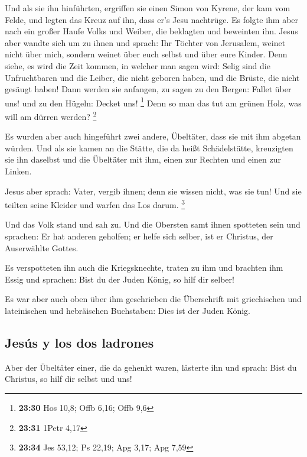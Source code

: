  Und als sie ihn hinführten, ergriffen sie einen Simon
von Kyrene, der kam vom Felde, und legten das Kreuz auf ihn, dass er's
Jesu nachtrüge.  Es folgte ihm aber nach ein großer Haufe
Volks und Weiber, die beklagten und beweinten ihn.  Jesus
aber wandte sich um zu ihnen und sprach: Ihr Töchter von Jerusalem,
weinet nicht über mich, sondern weinet über euch selbst und über eure
Kinder.  Denn siehe, es wird die Zeit kommen, in welcher
man sagen wird: Selig sind die Unfruchtbaren und die Leiber, die nicht
geboren haben, und die Brüste, die nicht gesäugt haben! 
Dann werden sie anfangen, zu sagen zu den Bergen: Fallet über uns! und
zu den Hügeln: Decket uns! \footnote{\textbf{23:30} Hos 10,8; Offb 6,16;
  Offb 9,6}  Denn so man das tut am grünen Holz, was will
am dürren werden? \footnote{\textbf{23:31} 1Petr 4,17}

 Es wurden aber auch hingeführt zwei andere, Übeltäter,
dass sie mit ihm abgetan würden.  Und als sie kamen an
die Stätte, die da heißt Schädelstätte, kreuzigten sie ihn daselbst und
die Übeltäter mit ihm, einen zur Rechten und einen zur Linken.

 Jesus aber sprach: Vater, vergib ihnen; denn sie wissen
nicht, was sie tun! Und sie teilten seine Kleider und warfen das Los
darum. \footnote{\textbf{23:34} Jes 53,12; Ps 22,19; Apg 3,17; Apg 7,59}

 Und das Volk stand und sah zu. Und die Obersten samt
ihnen spotteten sein und sprachen: Er hat anderen geholfen; er helfe
sich selber, ist er Christus, der Auserwählte Gottes.

 Es verspotteten ihn auch die Kriegsknechte, traten zu
ihm und brachten ihm Essig  und sprachen: Bist du der
Juden König, so hilf dir selber!

 Es war aber auch oben über ihm geschrieben die
Überschrift mit griechischen und lateinischen und hebräischen
Buchstaben: Dies ist der Juden König.

\hypertarget{jesuxfas-y-los-dos-ladrones}{%
\subsection{Jesús y los dos
ladrones}\label{jesuxfas-y-los-dos-ladrones}}

 Aber der Übeltäter einer, die da gehenkt waren, lästerte
ihn und sprach: Bist du Christus, so hilf dir selbst und uns!

